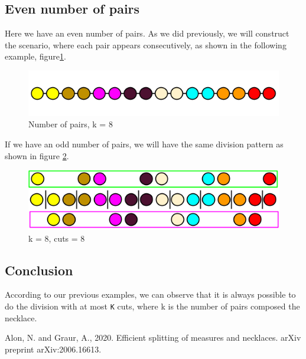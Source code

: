 \documentclass[a4paper,10pt]{article}
\begin{document}
\newpage\subsection{Even number of pairs}
Here we have an even number of pairs. As we did previously, we will construct the scenario, where each pair appears consecutively, as shown in the following example, figure\ref{19}.
\begin{figure}[H]
  \centering
\includegraphics[scale=.55]{k is even.png}
\caption{Number of pairs, k = 8}
\label{19}
\end{figure}

If we have an odd number of pairs, we will have the same division pattern as shown in figure \ref{20}.
\begin{figure}[H]
  \centering
\includegraphics[scale=.55]{k is even after division.png}
\caption{k = 8, cuts = 8}
\label{20}
\end{figure}
\subsection{Conclusion}
According to our previous examples, we can observe that it is always possible to do the division with at most \texttt{K} cuts, where k is the number of pairs composed the necklace.






\begin{thebibliography}{9}
Alon, N. and Graur, A., 2020. Efficient splitting of measures and necklaces. arXiv preprint arXiv:2006.16613.

\end{thebibliography}
\end{document}
